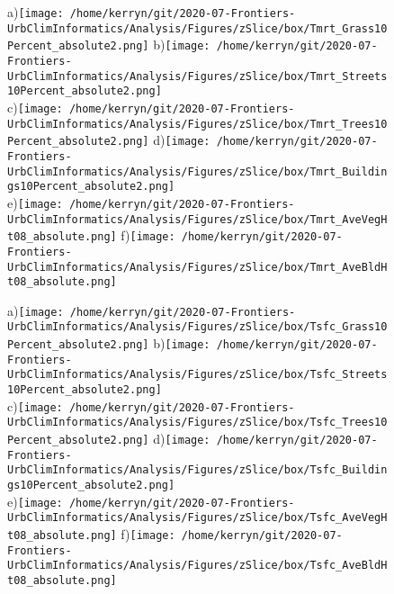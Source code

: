 \documentclass{article}
\begin{document}
\begin{figure}
\centering    
a)\texttt{[image: /home/kerryn/git/2020-07-Frontiers-UrbClimInformatics/Analysis/Figures/zSlice/box/Tmrt\_Grass10Percent\_absolute2.png]}
b)\texttt{[image: /home/kerryn/git/2020-07-Frontiers-UrbClimInformatics/Analysis/Figures/zSlice/box/Tmrt\_Streets10Percent\_absolute2.png]}\\
c)\texttt{[image: /home/kerryn/git/2020-07-Frontiers-UrbClimInformatics/Analysis/Figures/zSlice/box/Tmrt\_Trees10Percent\_absolute2.png]}
d)\texttt{[image: /home/kerryn/git/2020-07-Frontiers-UrbClimInformatics/Analysis/Figures/zSlice/box/Tmrt\_Buildings10Percent\_absolute2.png]}\\
e)\texttt{[image: /home/kerryn/git/2020-07-Frontiers-UrbClimInformatics/Analysis/Figures/zSlice/box/Tmrt\_AveVegHt08\_absolute.png]}
f)\texttt{[image: /home/kerryn/git/2020-07-Frontiers-UrbClimInformatics/Analysis/Figures/zSlice/box/Tmrt\_AveBldHt08\_absolute.png]}
\end{figure} 
\clearpage

\begin{figure}
\centering    
a)\texttt{[image: /home/kerryn/git/2020-07-Frontiers-UrbClimInformatics/Analysis/Figures/zSlice/box/Tsfc\_Grass10Percent\_absolute2.png]}
b)\texttt{[image: /home/kerryn/git/2020-07-Frontiers-UrbClimInformatics/Analysis/Figures/zSlice/box/Tsfc\_Streets10Percent\_absolute2.png]}\\
c)\texttt{[image: /home/kerryn/git/2020-07-Frontiers-UrbClimInformatics/Analysis/Figures/zSlice/box/Tsfc\_Trees10Percent\_absolute2.png]}
d)\texttt{[image: /home/kerryn/git/2020-07-Frontiers-UrbClimInformatics/Analysis/Figures/zSlice/box/Tsfc\_Buildings10Percent\_absolute2.png]}\\
e)\texttt{[image: /home/kerryn/git/2020-07-Frontiers-UrbClimInformatics/Analysis/Figures/zSlice/box/Tsfc\_AveVegHt08\_absolute.png]}
f)\texttt{[image: /home/kerryn/git/2020-07-Frontiers-UrbClimInformatics/Analysis/Figures/zSlice/box/Tsfc\_AveBldHt08\_absolute.png]}
\end{figure} 
\clearpage
\end{document}
